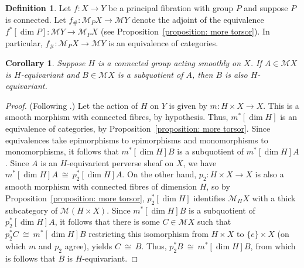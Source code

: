 \documentclass[10pt]{amsart}
\theoremstyle{plain}
\newtheorem{corollary}[theorem]{Corollary}
\theoremstyle{definition}
\newtheorem{definition}[theorem]{Definition}
\newcommand{\iso}{{\ \cong\ }}
\begin{document}
\begin{definition}\label{definition: descent}
Let ${f} : {X} \to {Y}$ be a principal fibration with group ${P}$ and suppose ${P}$ is connected. Let ${f}_\# : {\mathcal M}_{P}{X} \to {\mathcal M}{Y}$ denote the adjoint of the equivalence ${f}^*[\dim{P}] : {\mathcal M}{Y} \to {\mathcal M}_{P}{X}$ (see Proposition~\ref{proposition: more torsor}). In particular, ${f}_\# : {\mathcal M}_{P}{X} \to {\mathcal M}{Y}$ is an equivalence of categories.
\end{definition}

\begin{corollary}
Suppose $H$ is a connected group acting smoothly on $X$.
If $A\in {\mathcal M} X$ is $H$-equivariant and $B\in {\mathcal M} X$ is a subquotient of $A$, then $B$ is also $H$-equivariant.
\end{corollary}

\begin{proof}
(Following \cite[(1.9.1)]{CS}.)
Let the action of $H$ on $Y$ is given by $m : H\times X \to X$. This is a smooth morphism with connected fibres, by hypothesis. Thus, $m^*[\dim H]$ is an equivalence of categories, by Proposition~\ref{proposition: more torsor}.  Since equivalences take epimorphisms to epimorphisms and monomorphisms to monomorphisms, it follows that $m^*[\dim H]B$ is a subquotient of $m^*[\dim H]A$. Since $A$ is an $H$-equivarient perverse sheaf on $X$, we have $m^*[\dim H]A \iso p_2^*[\dim H]A$. On the other hand, $p_2 : H\times X \to X$ is also a smooth morphism with connected fibres of dimension $H$, so by Proposition~\ref{proposition: more torsor}, $p_2^*[\dim H]$ identifies ${\mathcal M}_H X$ with a thick subcategory of ${\mathcal M} (H\times X)$. Since $m^*[\dim H]B$ is a subquotient of $p_2^*[\dim H]A$, it follows that there is some $C\in {\mathcal M} X$ such that $p_2^*C \iso m^*[\dim H]B$ restricting this isomorphism from $H\times X$ to $\{ e\} \times X$ (on which $m$ and $p_2$ agree), yields $C\iso B$. Thus, $p_2^*B \iso m^*[\dim H]B$, from which is follows that $B$ is $H$-equivariant.
\end{proof}




\end{document}
